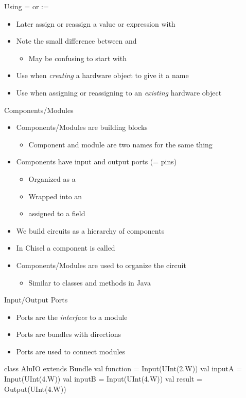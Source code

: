 \begin{frame}[fragile]{Using = or :=}
\begin{itemize}
\item Later assign or reassign a value or expression with \code{:=}
\end{itemize}
\begin{itemize}
\item Note the small difference between \code{=} and \code{:=}
\begin{itemize}
\item May be confusing to start with
\end{itemize}
\item Use \code{=} when \emph{creating} a hardware object to give it a name
\item Use \code{:=} when assigning or reassigning to an \emph{existing} hardware object
\end{itemize}
\end{frame}

\begin{frame}[fragile]{Components/Modules}
\begin{itemize}
\item Components/Modules are building blocks
\begin{itemize}
\item Component and module are two names for the same thing
\end{itemize}
\item Components have input and output ports (= pins)
\begin{itemize}
\item Organized as a 
\item Wrapped into an 
\item assigned to a field 
\end{itemize}
\item We build circuits as a hierarchy of components
\item In Chisel a component is called 
\item Components/Modules are used to organize the circuit
\begin{itemize}
\item Similar to classes and methods in Java
\end{itemize}
\end{itemize}
\end{frame}


\begin{frame}[fragile]{Input/Output Ports}
\begin{itemize}
\item Ports are the \emph{interface} to a module
\item Ports are bundles with directions
\item Ports are used to connect modules
\end{itemize}
\begin{chisel}
class AluIO extends Bundle {
  val function = Input(UInt(2.W))
  val inputA = Input(UInt(4.W))
  val inputB = Input(UInt(4.W))
  val result = Output(UInt(4.W))
}
\end{chisel}
\end{frame}


